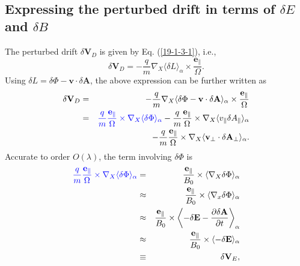 \documentclass{llncs}
\newcommand{\tmcolor}[2]{{\color{#1}{#2}}}
\begin{document}
\

\subsection{Expressing the perturbed drift in terms of $\delta E$ and $\delta
B$}\label{19-3-28-e1}\label{16-10-13-1}

The perturbed drift $\delta \mathbf{V}_D$ is given by Eq. (\ref{19-1-3-1}),
i.e.,
\begin{equation}
  \delta \mathbf{V}_D = - \frac{q}{m} \nabla_X \langle \delta L
  \rangle_{\alpha} \times \frac{\mathbf{e}_{\parallel}}{\Omega} .
\end{equation}
Using $\delta L = \delta \Phi -\mathbf{v} \cdot \delta \mathbf{A}$, the above
expression can be further written as
\begin{eqnarray}
  \delta \mathbf{V}_D & = & - \frac{q}{m} \nabla_X \langle \delta \Phi
  -\mathbf{v} \cdot \delta \mathbf{A} \rangle_{\alpha} \times
  \frac{\mathbf{e}_{\parallel}}{\Omega} \nonumber\\
  & = & \tmcolor{blue}{\frac{q}{m}  \frac{\mathbf{e}_{\parallel}}{\Omega}
  \times \nabla_X \langle \delta \Phi \rangle_{\alpha}} - \frac{q}{m} 
  \frac{\mathbf{e}_{\parallel}}{\Omega} \times \nabla_X \langle v_{\parallel}
  \delta A_{\parallel} \rangle_{\alpha} \nonumber\\
  &  & - \frac{q}{m}  \frac{\mathbf{e}_{\parallel}}{\Omega} \times \nabla_X
  \langle \mathbf{v}_{\perp} \cdot \delta \mathbf{A}_{\perp} \rangle_{\alpha}
  .  \label{18-9-14-p1}
\end{eqnarray}
Accurate to order $O (\lambda)$, the term involving $\delta \Phi$ is
\begin{eqnarray}
  \tmcolor{blue}{\frac{q}{m}  \frac{\mathbf{e}_{\parallel}}{\Omega} \times
  \nabla_X \langle \delta \Phi \rangle_{\alpha}} & = & 
  \frac{\mathbf{e}_{\parallel}}{B_0} \times \langle \nabla_X \delta \Phi
  \rangle_{\alpha} \nonumber\\
  & \approx &  \frac{\mathbf{e}_{\parallel}}{B_0} \times \langle \nabla_x
  \delta \Phi \rangle_{\alpha} \nonumber\\
  & \approx &  \frac{\mathbf{e}_{\parallel}}{B_0} \times \left\langle -
  \delta \mathbf{E}- \frac{\partial \delta \mathbf{A}}{\partial t}
  \right\rangle_{\alpha} \nonumber\\
  & \approx &  \frac{\mathbf{e}_{\parallel}}{B_0} \times \langle - \delta
  \mathbf{E} \rangle_{\alpha} \nonumber\\
  & \equiv & \delta \mathbf{V}_E,  \label{17-5-7-1}
\end{eqnarray}
\end{document}
